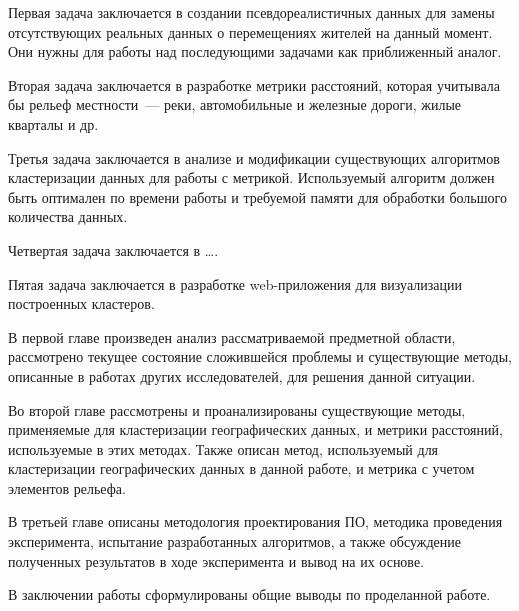 Первая задача заключается в создании псевдореалистичных данных для замены отсутствующих реальных данных о перемещениях жителей на данный момент. Они нужны для работы над последующими задачами как приближенный аналог.

Вторая задача заключается в разработке метрики расстояний, которая учитывала бы рельеф местности~--- реки, автомобильные и железные дороги, жилые кварталы и др.

Третья задача заключается в анализе и модификации существующих алгоритмов кластеризации данных для работы с метрикой. Используемый алгоритм должен быть оптимален по времени работы и требуемой памяти для обработки большого количества данных.

Четвертая задача заключается в \ldots.

Пятая задача заключается в разработке web-приложения для визуализации построенных кластеров.

В первой главе произведен анализ рассматриваемой предметной области, рассмотрено текущее состояние сложившейся проблемы и существующие методы, описанные в работах других исследователей, для решения данной ситуации.

Во второй главе рассмотрены и проанализированы существующие методы, применяемые для кластеризации географических данных, и метрики расстояний, используемые в этих методах. Также описан метод, используемый для кластеризации географических данных в данной работе, и метрика с учетом элементов рельефа.

В третьей главе описаны методология проектирования ПО, методика проведения эксперимента, испытание разработанных алгоритмов, а также обсуждение полученных результатов в ходе эксперимента и вывод на их основе.

В заключении работы сформулированы общие выводы по проделанной работе.
